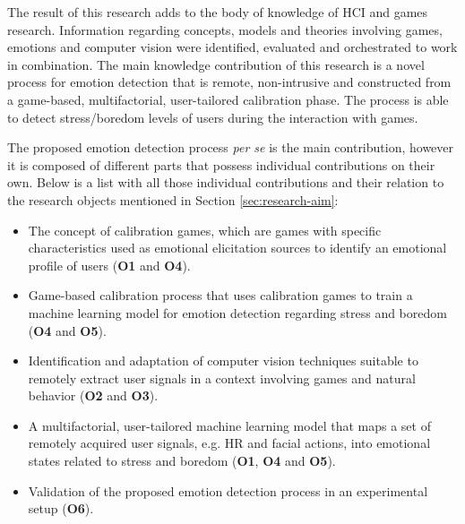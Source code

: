 The result of this research adds to the body of knowledge of HCI and games research. Information regarding concepts, models and theories involving games, emotions and computer vision were identified, evaluated and orchestrated to work in combination. The main knowledge contribution of this research is a novel process for emotion detection that is remote, non-intrusive and constructed from a game-based, multifactorial, user-tailored calibration phase. The process is able to detect stress/boredom levels of users during the interaction with games.

The proposed emotion detection process \textit{per se} is the main contribution, however it is composed of different parts that possess individual contributions on their own. Below is a list with all those individual contributions and their relation to the research objects mentioned in Section \ref{sec:research-aim}:

\begin{itemize}
  \item The concept of calibration games, which are games with specific characteristics used as emotional elicitation sources to identify an emotional profile of users (\textbf{O1} and \textbf{O4}).
  \item Game-based calibration process that uses calibration games to train a machine learning model for emotion detection regarding stress and boredom (\textbf{O4} and \textbf{O5}).
  \item Identification and adaptation of computer vision techniques suitable to remotely extract user signals in a context involving games and natural behavior (\textbf{O2} and \textbf{O3}).
  \item A multifactorial, user-tailored machine learning model that maps a set of remotely acquired user signals, e.g. HR and facial actions, into emotional states related to stress and boredom (\textbf{O1}, \textbf{O4} and \textbf{O5}).
  \item Validation of the proposed emotion detection process in an experimental setup (\textbf{O6}).
\end{itemize}

